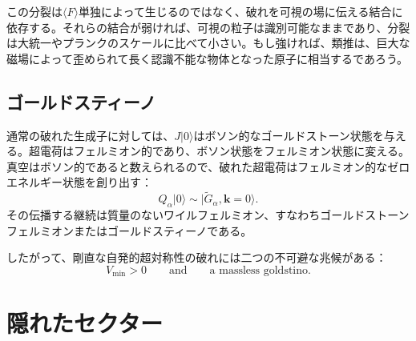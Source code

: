 \begin{classroomqa}
\end{classroomqa}

この分裂は\(\langle F\rangle\)単独によって生じるのではなく、破れを可視の場に伝える結合に依存する。それらの結合が弱ければ、可視の粒子は識別可能なままであり、分裂は大統一やプランクのスケールに比べて小さい。もし強ければ、類推は、巨大な磁場によって歪められて長く認識不能な物体となった原子に相当するであろう。

\subsection{ゴールドスティーノ}

通常の破れた生成子に対しては、\(J|0\rangle\)はボソン的なゴールドストーン状態を与える。超電荷はフェルミオン的であり、ボソン状態をフェルミオン状態に変える。真空はボソン的であると数えられるので、破れた超電荷はフェルミオン的なゼロエネルギー状態を創り出す：
\begin{equation}
Q_\alpha|0\rangle
\sim
|\widetilde G_\alpha,\mathbf k=0\rangle.
\label{eq:l9-goldstino}
\end{equation}
その伝播する継続は質量のないワイルフェルミオン、すなわちゴールドストーンフェルミオンまたはゴールドスティーノである。

\begin{classroomqa}
\end{classroomqa}

したがって、剛直な自発的超対称性の破れには二つの不可避な兆候がある：
\begin{equation}
\boxed{
V_{\min}>0
\qquad\text{and}\qquad
\text{a massless goldstino}.
}
\label{eq:l9-rigid-breaking-signatures}
\end{equation}

\section{隠れたセクター}

